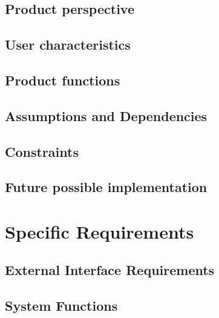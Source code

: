 \documentclass{article}
\begin{document}
	\subsection{Product perspective}
	
	
	\subsection{User characteristics}
	
	
		\subsection{Product functions}
	
	
	\subsection{Assumptions and Dependencies}
	
	
	\subsection{Constraints}
	
		
	\subsection{Future possible implementation}
	
	
	
\newpage	    
\section{Specific Requirements}

	\subsection{External Interface Requirements}
	
	
	\subsection{System Functions}
	
	
\end{document}
